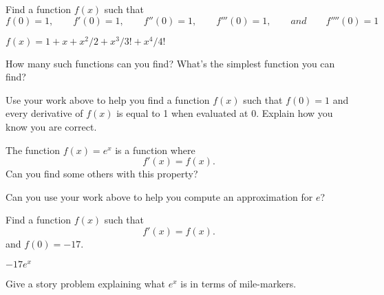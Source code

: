 \documentclass{article}
\begin{document}
\begin{exercise}
  Find a function $f(x)$ such that
  \[
  f(0) = 1,\qquad f'(0) = 1, \qquad f''(0)=1, \qquad f'''(0) = 1,\qquad and \qquad f''''(0) = 1
  \]
  \begin{answer}
    $f(x) = 1+x+x^2/2+x^3/3!+x^4/4!$
  \end{answer}
  \pause
  How many such functions can you find? What's the simplest function you
  can find?
  \begin{answer}
  \end{answer}
\end{exercise}


\begin{exercise}
  Use your work above to help you find a function $f(x)$ such that $f(0)
  = 1$ and every derivative of $f(x)$ is equal to 1 when evaluated at
  $0$. Explain how you know you are correct.
  \begin{answer}
  \end{answer}
\end{exercise}



\begin{exercise}
  The function $f(x) = e^x$ is a function where
  \[
  f'(x) = f(x).
  \]
  Can you find some others with this property? 
  \begin{answer}
  \end{answer}
\end{exercise}

\begin{exercise}
  Can you use your work above to help you compute an approximation for
  $e$?
  \begin{answer}
  \end{answer}
\end{exercise}

\begin{exercise}
  Find a function $f(x)$ such that
  \[
  f'(x) = f(x).
  \]
  and $f(0) = -17$.
  \begin{answer}
    $-17e^x$
  \end{answer}
\end{exercise}


\begin{exercise}
  Give a story problem explaining what $e^x$ is in terms of
  mile-markers.
  \begin{answer}
  \end{answer}
\end{exercise}
\end{document}
